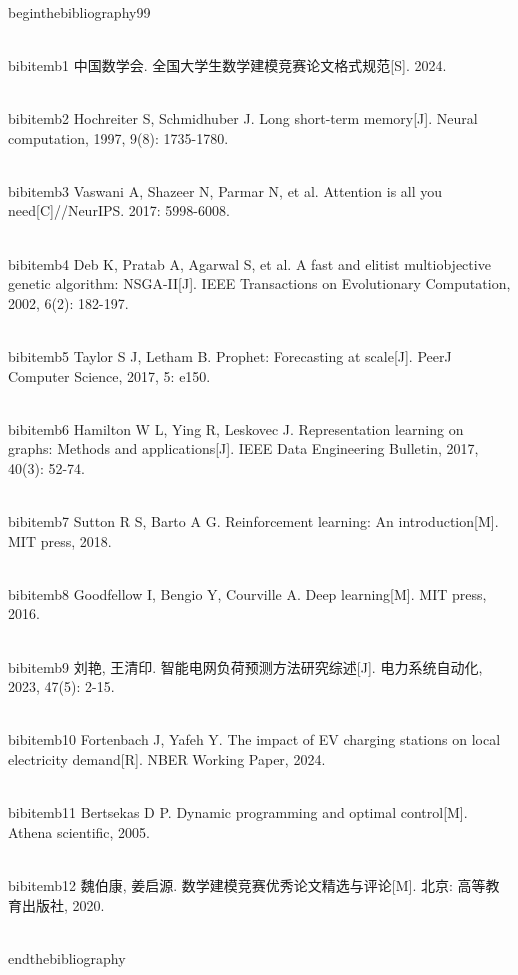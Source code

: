 \\begin{thebibliography}{99}

\\bibitem{b1} 中国数学会. 全国大学生数学建模竞赛论文格式规范[S]. 2024.

\\bibitem{b2} Hochreiter S, Schmidhuber J. Long short-term memory[J]. Neural computation, 1997, 9(8): 1735-1780.

\\bibitem{b3} Vaswani A, Shazeer N, Parmar N, et al. Attention is all you need[C]//NeurIPS. 2017: 5998-6008.

\\bibitem{b4} Deb K, Pratab A, Agarwal S, et al. A fast and elitist multiobjective genetic algorithm: NSGA-II[J]. IEEE Transactions on Evolutionary Computation, 2002, 6(2): 182-197.

\\bibitem{b5} Taylor S J, Letham B. Prophet: Forecasting at scale[J]. PeerJ Computer Science, 2017, 5: e150.

\\bibitem{b6} Hamilton W L, Ying R, Leskovec J. Representation learning on graphs: Methods and applications[J]. IEEE Data Engineering Bulletin, 2017, 40(3): 52-74.

\\bibitem{b7} Sutton R S, Barto A G. Reinforcement learning: An introduction[M]. MIT press, 2018.

\\bibitem{b8} Goodfellow I, Bengio Y, Courville A. Deep learning[M]. MIT press, 2016.

\\bibitem{b9} 刘艳, 王清印. 智能电网负荷预测方法研究综述[J]. 电力系统自动化, 2023, 47(5): 2-15.

\\bibitem{b10} Fortenbach J, Yafeh Y. The impact of EV charging stations on local electricity demand[R]. NBER Working Paper, 2024.

\\bibitem{b11} Bertsekas D P. Dynamic programming and optimal control[M]. Athena scientific, 2005.

\\bibitem{b12} 魏伯康, 姜启源. 数学建模竞赛优秀论文精选与评论[M]. 北京: 高等教育出版社, 2020.

\\end{thebibliography}
